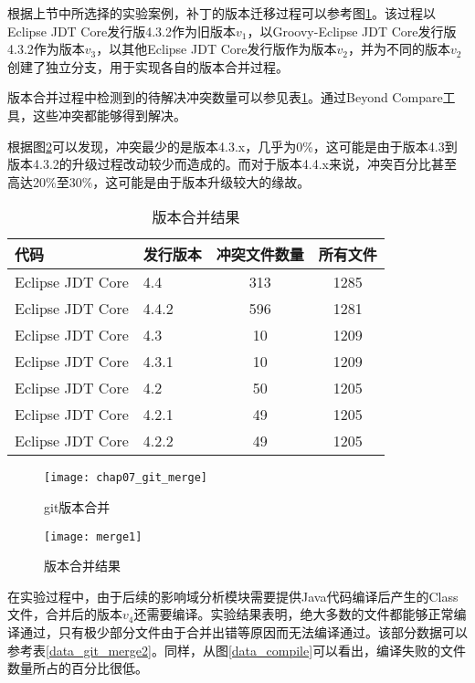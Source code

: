 根据上节中所选择的实验案例，补丁的版本迁移过程可以参考图\ref {exp_git_merge}。该过程以Eclipse JDT Core发行版4.3.2作为旧版本$v_1$，以Groovy-Eclipse JDT Core发行版4.3.2作为版本$v_3$，以其他Eclipse JDT Core发行版作为版本$v_2$，并为不同的版本$v_2$创建了独立分支，用于实现各自的版本合并过程。

版本合并过程中检测到的待解决冲突数量可以参见表\ref {data_git_merge}。通过Beyond Compare工具，这些冲突都能够得到解决。

根据图\ref {data_merge}可以发现，冲突最少的是版本4.3.x，几乎为0\%，这可能是由于版本4.3到版本4.3.2的升级过程改动较少而造成的。而对于版本4.4.x来说，冲突百分比甚至高达20\%至30\%，这可能是由于版本升级较大的缘故。




\begin{table}[H]
	\caption{版本合并结果}
	\label{data_git_merge}
	\centering
	\begin{tabular}{llcc}
		\toprule[1.5pt]
		{\heiti 代码} & {\heiti 发行版本} & {\heiti 冲突文件数量} & {\heiti 所有文件}\\\midrule[1pt]
		Eclipse JDT Core & 4.4 & 313 & 1285\\
		Eclipse JDT Core & 4.4.2 & 596 & 1281\\
		Eclipse JDT Core & 4.3 & 10 & 1209\\
		Eclipse JDT Core & 4.3.1 & 10 & 1209\\
		Eclipse JDT Core & 4.2 & 50 & 1205\\
		Eclipse JDT Core & 4.2.1 & 49 & 1205\\
		Eclipse JDT Core & 4.2.2 & 49 & 1205\\
		\bottomrule[1.5pt]
	\end{tabular}
\end{table}

\begin{figure}[H]
	\centering
	\texttt{[image: chap07\_git\_merge]}
	\caption {git版本合并}
	\label {exp_git_merge}	
\end{figure}

\begin{figure}[H]
	\centering
	\texttt{[image: merge1]}
	\caption {版本合并结果}
	\label {data_merge}	
\end{figure}


在实验过程中，由于后续的影响域分析模块需要提供Java代码编译后产生的Class文件，合并后的版本$v_4$还需要编译。实验结果表明，绝大多数的文件都能够正常编译通过，只有极少部分文件由于合并出错等原因而无法编译通过。该部分数据可以参考表\ref {data_git_merge2}。同样，从图\ref {data_compile}可以看出，编译失败的文件数量所占的百分比很低。


